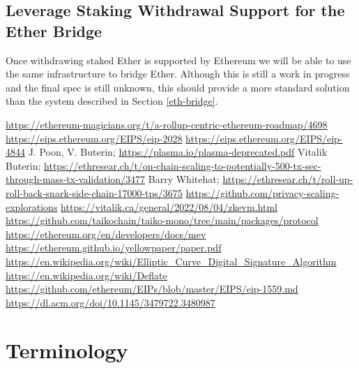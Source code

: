 \documentclass[9pt,oneside]{amsart}
\begin{document}
\begin{multicols}{2}
\subsection{Leverage Staking Withdrawal Support for the Ether Bridge}\label{sec:withdrawals}
Once withdrawing staked Ether is supported by Ethereum we will be able to use the same infrastructure to bridge Ether. Although this is still a work in progress and the final spec is still unknown, this should provide a more standard solution than the system described in Section \ref{eth-bridge}.

\end{multicols}

\begin{thebibliography}{9}
\url{https://ethereum-magicians.org/t/a-rollup-centric-ethereum-roadmap/4698}
\url{https://eips.ethereum.org/EIPS/eip-2028}
\url{https://eips.ethereum.org/EIPS/eip-4844}
J. Poon, V. Buterin; \url{https://plasma.io/plasma-deprecated.pdf}
Vitalik Buterin; \url{https://ethresear.ch/t/on-chain-scaling-to-potentially-500-tx-sec-through-mass-tx-validation/3477}
Barry Whitehat; \url{https://ethresear.ch/t/roll-up-roll-back-snark-side-chain-17000-tps/3675}
\url{https://github.com/privacy-scaling-explorations}
\url{https://vitalik.ca/general/2022/08/04/zkevm.html}
\url{https://github.com/taikochain/taiko-mono/tree/main/packages/protocol}
\url{https://ethereum.org/en/developers/docs/mev}
\url{https://ethereum.github.io/yellowpaper/paper.pdf}
\url{https://en.wikipedia.org/wiki/Elliptic_Curve_Digital_Signature_Algorithm}
\url{https://en.wikipedia.org/wiki/Deflate}
\url{https://github.com/ethereum/EIPs/blob/master/EIPS/eip-1559.md}
\url{https://dl.acm.org/doi/10.1145/3479722.3480987}

\end{thebibliography}

\appendix

\section{Terminology} \label{ch:Terminology}
\end{document}
